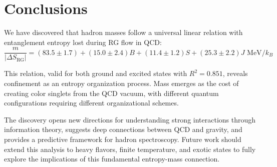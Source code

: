 \documentclass[12pt,a4paper]{article}
\begin{document}
\section{Conclusions}

We have discovered that hadron masses follow a universal linear relation with entanglement entropy lost during RG flow in QCD:
\begin{equation}
\boxed{\frac{m}{|\Delta S_{\text{RG}}|} = (83.5 \pm 1.7) + (15.0 \pm 2.4)B + (11.4 \pm 1.2)S + (25.3 \pm 2.2)J \text{ MeV}/k_B}
\end{equation}

This relation, valid for both ground and excited states with $R^2 = 0.851$, reveals confinement as an entropy organization process. Mass emerges as the cost of creating color singlets from the QCD vacuum, with different quantum configurations requiring different organizational schemes.

The discovery opens new directions for understanding strong interactions through information theory, suggests deep connections between QCD and gravity, and provides a predictive framework for hadron spectroscopy. Future work should extend this analysis to heavy flavors, finite temperature, and exotic states to fully explore the implications of this fundamental entropy-mass connection.
\end{document}
